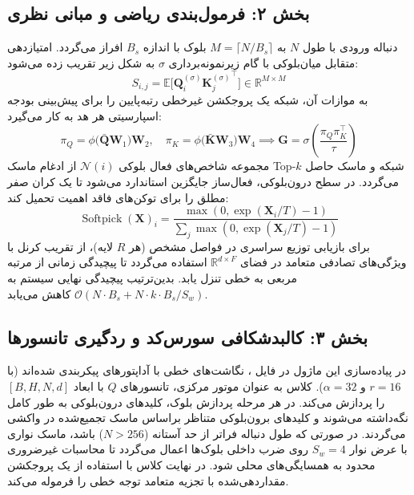 \subsection*{بخش ۲: فرمول‌بندی ریاضی و مبانی نظری }
دنباله ورودی با طول $N$ به $M = \lceil N / B_s \rceil$ بلوک با اندازه $B_s$ افراز می‌گردد. امتیازدهی متقابل میان‌بلوکی  با گام زیرنمونه‌برداری $\sigma$ به شکل زیر تقریب زده می‌شود:
\begin{equation}
S_{i,j} = \mathbb{E}\big[\mathbf{Q}_{i}^{(\sigma)} {\mathbf{K}_{j}^{(\sigma)}}^\top\big] \in \mathbb{R}^{M \times M}
\end{equation}
به موازات آن، شبکه  یک پروجکشن غیرخطی رتبه‌پایین را برای پیش‌بینی بودجه اسپارسیتی هر هد به کار می‌گیرد:
\begin{equation}
\pi_Q = \phi\big(\bar{\mathbf{Q}} \mathbf{W}_1\big) \mathbf{W}_2, \quad \pi_K = \phi\big(\bar{\mathbf{K}} \mathbf{W}_3\big) \mathbf{W}_4 \implies \mathbf{G} = \sigma\left(\frac{\pi_Q \pi_K^\top}{\tau}\right)
\end{equation}
مجموعه شاخص‌های فعال بلوکی $\mathcal{N}(i)$ از ادغام ماسک Top-$k$ شبکه  و ماسک  حاصل می‌گردد. در سطح درون‌بلوکی، فعال‌ساز  جایگزین  استاندارد می‌شود تا یک کران صفر مطلق را برای توکن‌های فاقد اهمیت تحمیل کند:
\begin{equation}
\operatorname{Softpick}(\mathbf{X})_i = \frac{\max\left(0, \exp(\mathbf{X}_i / T) - 1\right)}{\sum_j \max\left(0, \exp(\mathbf{X}_j / T) - 1\right)}
\end{equation}
برای بازیابی توزیع سراسری در فواصل مشخص (هر $R$ لایه)، از تقریب کرنل با ویژگی‌های تصادفی متعامد  در فضای $\mathbb{R}^{d \times F}$ استفاده می‌گردد تا پیچیدگی زمانی از مرتبه مربعی به خطی تنزل یابد. بدین‌ترتیب پیچیدگی نهایی سیستم به $\mathcal{O}\left(N \cdot B_s + N \cdot k \cdot B_s / S_w\right)$ کاهش می‌یابد.

\subsection*{بخش ۳: کالبدشکافی سورس‌کد و ردگیری تانسورها }
در پیاده‌سازی این ماژول در فایل ، نگاشت‌های خطی با آداپتورهای  پیکربندی شده‌اند (با $r=16$ و $\alpha=32$). کلاس  به عنوان موتور مرکزی، تانسورهای $Q$ با ابعاد $[B, H, N, d]$ را پردازش می‌کند. 
در هر مرحله پردازش بلوک، کلیدهای درون‌بلوکی  به طور کامل نگه‌داشته می‌شوند و کلیدهای برون‌بلوکی متناظر براساس ماسک تجمیع‌شده در  واکشی می‌گردند. در صورتی که طول دنباله فراتر از حد آستانه ($N > 256$) باشد، ماسک نواری  با عرض نوار $S_w = 4$ روی ضرب داخلی بلوک‌ها اعمال می‌گردد تا محاسبات غیرضروری محدود به همسایگی‌های محلی شود. 
در نهایت کلاس  با استفاده از یک پروجکشن مقداردهی‌شده با تجزیه متعامد  توجه خطی را فرموله می‌کند.

